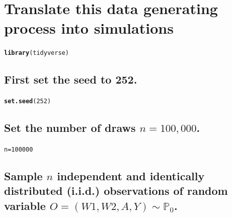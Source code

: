 \documentclass{article}\usepackage[]{graphicx}\usepackage[]{xcolor}
\makeatletter
\newcommand{\hlnum}[1]{\textcolor[rgb]{0.686,0.059,0.569}{#1}}%
\newcommand{\hlstd}[1]{\textcolor[rgb]{0.345,0.345,0.345}{#1}}%
\newcommand{\hlkwb}[1]{\textcolor[rgb]{0.69,0.353,0.396}{#1}}%
\newcommand{\hlkwd}[1]{\textcolor[rgb]{0.737,0.353,0.396}{\textbf{#1}}}%
\newenvironment{kframe}{%
 \def\at@end@of@kframe{}%
 \ifinner\ifhmode%
  \def\at@end@of@kframe{\end{minipage}}%
  \begin{minipage}{\columnwidth}%
 \fi\fi%
 \def\FrameCommand##1{\hskip\@totalleftmargin \hskip-\fboxsep
 \colorbox{shadecolor}{##1}\hskip-\fboxsep
     \hskip-\linewidth \hskip-\@totalleftmargin \hskip\columnwidth}%
 \MakeFramed {\advance\hsize-\width
   \@totalleftmargin\z@ \linewidth\hsize
   \@setminipage}}%
 {\par\unskip\endMakeFramed%
 \at@end@of@kframe}
\newenvironment{knitrout}{}{} %
\makeatother
\begin{document}
\section{Translate this data generating process into simulations}

\begin{knitrout}
\color{fgcolor}\begin{kframe}
\begin{alltt}
\hlkwd{library}\hlstd{(tidyverse)}
\end{alltt}
\end{kframe}
\end{knitrout}


  \subsection{First set the seed to 252.}
  
\begin{knitrout}
\color{fgcolor}\begin{kframe}
\begin{alltt}
\hlkwd{set.seed}\hlstd{(}\hlnum{252}\hlstd{)}
\end{alltt}
\end{kframe}
\end{knitrout}
  
  \subsection{Set the number of draws $n = 100,000$.}
  
\begin{knitrout}
\color{fgcolor}\begin{kframe}
\begin{alltt}
\hlstd{n} \hlkwb{=} \hlnum{100000}
\end{alltt}
\end{kframe}
\end{knitrout}
  
  \subsection{Sample $n$ independent and identically distributed (i.i.d.) observations of random variable $O=(W1,W2,A,Y) \sim \mathbb{P}_0$.}
  
\end{document}
